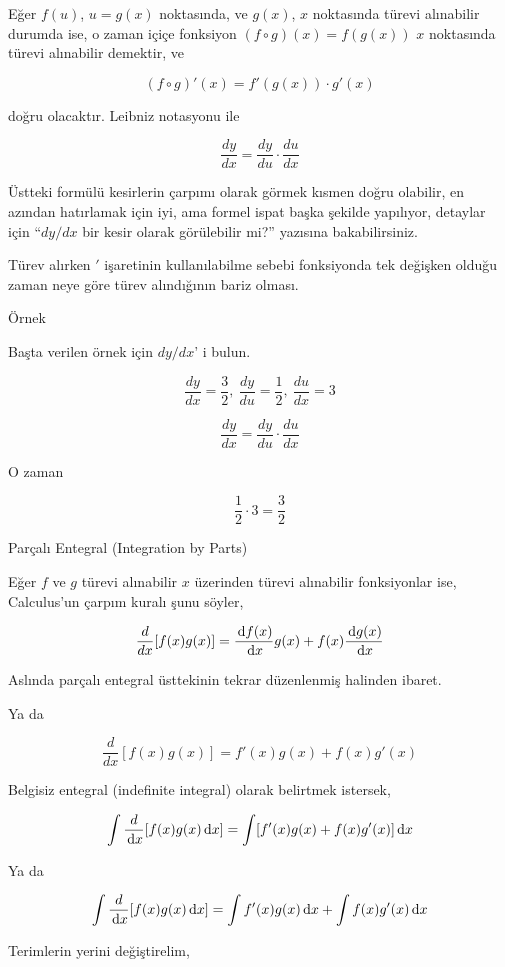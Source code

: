 \documentclass[12pt,fleqn]{article}\usepackage{../../common}
\begin{document}
Eğer $f(u)$, $u=g(x)$ noktasında, ve $g(x)$, $x$ noktasında türevi
alınabilir durumda ise, o zaman içiçe fonksiyon $(f \circ g)(x) = f(g(x))$
$x$ noktasında türevi alınabilir demektir, ve

$$ (f \circ g)'(x) = f'(g(x)) \cdot g'(x) $$

doğru olacaktır. Leibniz notasyonu ile 

$$ \frac{ dy}{dx} = \frac{ dy}{du} \cdot \frac{ du}{dx} $$

Üstteki formülü kesirlerin çarpımı olarak görmek kısmen doğru olabilir, en
azından hatırlamak için iyi, ama formel ispat başka şekilde yapılıyor,
detaylar için ``$dy/dx$ bir kesir olarak görülebilir mi?'' yazısına
bakabilirsiniz.

Türev alırken $'$ işaretinin kullanılabilme sebebi fonksiyonda tek değişken
olduğu zaman neye göre türev alındığının bariz olması.

Örnek 

Başta verilen örnek için $dy/dx$' i bulun. 

$$ \frac{ dy}{dx} = \frac{ 3}{2}, \
\frac{dy}{du} = \frac{ 1}{2}, \
\frac{ du}{dx} = 3
 $$

$$ \frac{ dy}{dx} = \frac{ dy}{du} \cdot \frac{ du}{dx} $$

O zaman 

$$ \frac{ 1}{2} \cdot 3 = \frac{ 3}{2} $$

\newpage

Parçalı Entegral (Integration by Parts)

Eğer $f$ ve $g$ türevi alınabilir $x$ üzerinden türevi alınabilir
fonksiyonlar ise, Calculus'un çarpım kuralı şunu söyler, 

$$ 
\frac{d}{dx} [ f(x)g(x) ] = 
\frac{\,\mathrm{d} f(x)}{\,\mathrm{d} x}g(x) + f(x) \frac{\,\mathrm{d}  g(x)}{\,\mathrm{d} x}
$$

Aslında parçalı entegral üsttekinin tekrar düzenlenmiş halinden ibaret. 

Ya da

$$ \frac{d}{dx} [ f(x)g(x) ] = f'(x)g(x) + f(x)g'(x)$$

Belgisiz entegral (indefinite integral) olarak belirtmek istersek, 

$$ \int \frac{d}{\,\mathrm{d} x}[ f(x)g(x) \,\mathrm{d} x ] = \int [f'(x)g(x) + f(x)g'(x)] \,\mathrm{d} x$$

Ya da

$$
\int \frac{d}{\,\mathrm{d} x}[ f(x)g(x) \,\mathrm{d} x ] = \int f'(x)g(x) \,\mathrm{d} x + \int f(x)g'(x)\,\mathrm{d} x
$$

Terimlerin yerini değiştirelim, 
\end{document}
